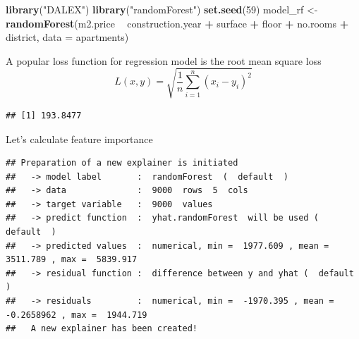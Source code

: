\documentclass[12pt,]{krantz}
\newenvironment{Shaded}{\begin{snugshade}}{\end{snugshade}}
\newcommand{\DataTypeTok}[1]{\textcolor[rgb]{0.13,0.29,0.53}{#1}}
\newcommand{\DecValTok}[1]{\textcolor[rgb]{0.00,0.00,0.81}{#1}}
\newcommand{\KeywordTok}[1]{\textcolor[rgb]{0.13,0.29,0.53}{\textbf{#1}}}
\newcommand{\NormalTok}[1]{#1}
\newcommand{\OperatorTok}[1]{\textcolor[rgb]{0.81,0.36,0.00}{\textbf{#1}}}
\newcommand{\OtherTok}[1]{\textcolor[rgb]{0.56,0.35,0.01}{#1}}
\newcommand{\StringTok}[1]{\textcolor[rgb]{0.31,0.60,0.02}{#1}}
\begin{document}
\begin{Shaded}
\begin{Highlighting}[]
\KeywordTok{library}\NormalTok{(}\StringTok{"DALEX"}\NormalTok{)}
\KeywordTok{library}\NormalTok{(}\StringTok{"randomForest"}\NormalTok{)}
\KeywordTok{set.seed}\NormalTok{(}\DecValTok{59}\NormalTok{)}
\NormalTok{model_rf <-}\StringTok{ }\KeywordTok{randomForest}\NormalTok{(m2.price }\OperatorTok{~}\StringTok{ }\NormalTok{construction.year }\OperatorTok{+}\StringTok{ }\NormalTok{surface }\OperatorTok{+}\StringTok{ }\NormalTok{floor }\OperatorTok{+}\StringTok{ }
\StringTok{                           }\NormalTok{no.rooms }\OperatorTok{+}\StringTok{ }\NormalTok{district, }\DataTypeTok{data =}\NormalTok{ apartments)}
\end{Highlighting}
\end{Shaded}

A popular loss function for regression model is the root mean square loss
\[
  L(x, y) = \sqrt{\frac1n \sum_{i=1}^n (x_i - y_i)^2}
\]

\begin{Shaded}
\end{Shaded}

\begin{verbatim}
## [1] 193.8477
\end{verbatim}

Let's calculate feature importance

\begin{Shaded}
\end{Shaded}

\begin{verbatim}
## Preparation of a new explainer is initiated
##   -> model label       :  randomForest  (  default  )
##   -> data              :  9000  rows  5  cols 
##   -> target variable   :  9000  values 
##   -> predict function  :  yhat.randomForest  will be used (  default  )
##   -> predicted values  :  numerical, min =  1977.609 , mean =  3511.789 , max =  5839.917  
##   -> residual function :  difference between y and yhat (  default  )
##   -> residuals         :  numerical, min =  -1970.395 , mean =  -0.2658962 , max =  1944.719  
##   A new explainer has been created!
\end{verbatim}
\end{document}
